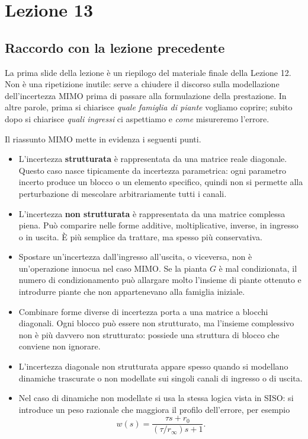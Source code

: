 \documentclass[11pt,a4paper]{article}
\begin{document}
\section{Lezione 13}

\subsection{Raccordo con la lezione precedente}

La prima slide della lezione \`e un riepilogo del materiale finale della Lezione 12. Non \`e una ripetizione inutile: serve a chiudere il discorso sulla modellazione dell'incertezza MIMO prima di passare alla formulazione della prestazione. In altre parole, prima si chiarisce \emph{quale famiglia di piante} vogliamo coprire; subito dopo si chiarisce \emph{quali ingressi} ci aspettiamo e \emph{come} misureremo l'errore.

Il riassunto MIMO mette in evidenza i seguenti punti.
\begin{itemize}
    \item L'incertezza \textbf{strutturata} \`e rappresentata da una matrice reale diagonale. Questo caso nasce tipicamente da incertezza parametrica: ogni parametro incerto produce un blocco o un elemento specifico, quindi non si permette alla perturbazione di mescolare arbitrariamente tutti i canali.
    \item L'incertezza \textbf{non strutturata} \`e rappresentata da una matrice complessa piena. Pu\`o comparire nelle forme additive, moltiplicative, inverse, in ingresso o in uscita. \`E pi\`u semplice da trattare, ma spesso pi\`u conservativa.
    \item Spostare un'incertezza dall'ingresso all'uscita, o viceversa, non \`e un'operazione innocua nel caso MIMO. Se la pianta $G$ \`e mal condizionata, il numero di condizionamento pu\`o allargare molto l'insieme di piante ottenuto e introdurre piante che non appartenevano alla famiglia iniziale.
    \item Combinare forme diverse di incertezza porta a una matrice a blocchi diagonali. Ogni blocco pu\`o essere non strutturato, ma l'insieme complessivo non \`e pi\`u davvero non strutturato: possiede una struttura di blocco che conviene non ignorare.
    \item L'incertezza diagonale non strutturata appare spesso quando si modellano dinamiche trascurate o non modellate sui singoli canali di ingresso o di uscita.
    \item Nel caso di dinamiche non modellate si usa la stessa logica vista in SISO: si introduce un peso razionale che maggiora il profilo dell'errore, per esempio
    $$
    w(s)=\frac{\tau s+r_0}{(\tau/r_\infty)s+1}.
    $$
\end{itemize}
\end{document}
